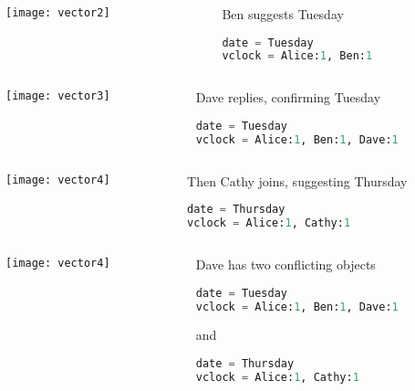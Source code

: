 \documentclass[aspectratio=169, 15pt,usenames,dvipsnames]{beamer}
\begin{document}
	\cprotEnv\begin{gdblank}
	\begin{columns}
		\begin{column}{0.5\textwidth}
			\texttt{[image: vector2]}			
		\end{column}
		\begin{column}{0.5\textwidth}				
			Ben suggests Tuesday
			\begin{lstlisting}[language=Python]
date = Tuesday
vclock = Alice:1, Ben:1
			\end{lstlisting}
		\end{column}	
	\end{columns} 
	\note{
		Вторник
	}
	\end{gdblank}
	\cprotEnv\begin{gdblank}
	\begin{columns}
		\begin{column}{0.5\textwidth}
			\texttt{[image: vector3]}			
		\end{column}
		\begin{column}{0.5\textwidth}				
			Dave replies, confirming Tuesday
			\begin{lstlisting}[language=Python]
date = Tuesday
vclock = Alice:1, Ben:1, Dave:1
			\end{lstlisting}
		\end{column}	
	\end{columns} 
	\end{gdblank}
	\cprotEnv\begin{gdblank}
	\begin{columns}
		\begin{column}{0.5\textwidth}
			\texttt{[image: vector4]}			
		\end{column}
		\begin{column}{0.5\textwidth}				
			Then Cathy joins, suggesting Thursday
			\begin{lstlisting}[language=Python]
date = Thursday
vclock = Alice:1, Cathy:1
			\end{lstlisting}
		\end{column}	
	\end{columns} 
	\note{
		Четверг
	}
	\end{gdblank}
	\cprotEnv\begin{gdblank}
	\begin{columns}
		\begin{column}{0.5\textwidth}
			\texttt{[image: vector4]}			
		\end{column}
		\begin{column}{0.5\textwidth}				
			Dave has two conflicting objects
			\begin{lstlisting}[language=Python]
date = Tuesday
vclock = Alice:1, Ben:1, Dave:1
			\end{lstlisting}
			and
			\begin{lstlisting}[language=Python]
date = Thursday
vclock = Alice:1, Cathy:1
			\end{lstlisting}
		\end{column}	
	\end{columns} 
	\end{gdblank}
\end{document}
